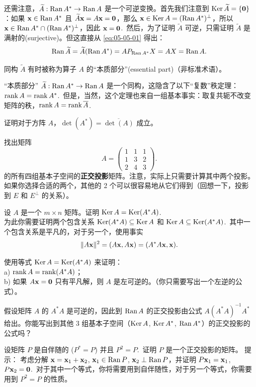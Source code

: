 还需注意，$\widetilde{A}: \operatorname{Ran} A^* \to \operatorname{Ran} A$ 是一个可逆变换。首先我们注意到 $\operatorname{Ker} \widetilde{A} = \{\mathbf{0}\}$：如果 $\mathbf{x} \in \operatorname{Ran} A^*$ 且 $\widetilde{A}\mathbf{x} = A\mathbf{x} = \mathbf{0}$，那么 $\mathbf{x} \in \operatorname{Ker} A = (\operatorname{Ran} A^*)^\perp$，所以 $\mathbf{x} \in \operatorname{Ran} A^* \cap (\operatorname{Ran} A^*)^\perp$，因此 $\mathbf{x} = \mathbf{0}$.~然后，为了证明 $\widetilde{A}$ 可逆，只需证明 $\widetilde{A}$ 是满射的(surjective)。但这直接从 \eqref{eq:05-05-01} 得出：$$\operatorname{Ran} \widetilde{A} = \widetilde{A}(\operatorname{Ran} A^*) = A P_{\operatorname{Ran} A^*} X = AX = \operatorname{Ran} A.$$

同构 $\widetilde{A}$ 有时被称为算子 $A$ 的“本质部分”(essential part)（非标准术语）。

“本质部分” $\widetilde{A}: \operatorname{Ran} A^* \to \operatorname{Ran} A$ 是一个同构，这隐含了以下“复数”秩定理：$\operatorname{rank} A = \operatorname{rank} A^*$.~但是，当然，这个定理也来自一组基本事实：取复共轭不改变矩阵的秩，$\operatorname{rank} A = \operatorname{rank} \overline{A}$.~

\begin{problemset}
\item \label{ex:05-05-01} 证明对于方阵 $A$，$\det(A^*) = \overline{\det(A)}$ 成立。
\item \label{ex:05-05-02} 找出矩阵
$$A = \begin{pmatrix} 1 & 1 & 1 \\ 1 & 3 & 2 \\ 2 & 4 & 3 \end{pmatrix}.$$
的所有四组基本子空间的\textbf{正交投影}矩阵。注意，实际上只需要计算其中两个投影。如果你选择合适的两个，其他的 2 个可以很容易地从它们得到（回想一下，投影到 $E$ 和 $E^\perp$ 的关系）。
\item \label{ex:05-05-03} 设 $A$ 是一个 $m \times n$ 矩阵。证明 $\operatorname{Ker} A = \operatorname{Ker}(A^*A)$.~
\\
为此你需要证明两个包含关系 $\operatorname{Ker}(A^*A) \subseteq \operatorname{Ker} A$ 和 $\operatorname{Ker} A \subseteq \operatorname{Ker}(A^*A)$.~其中一个包含关系是平凡的，对于另一个，使用事实
$$\|A\mathbf{x}\|^2 = (A\mathbf{x}, A\mathbf{x}) = (A^*A\mathbf{x}, \mathbf{x}).$$
\item \label{ex:05-05-04} 使用等式 $\operatorname{Ker} A = \operatorname{Ker}(A^*A)$ 来证明：
\\
a) $\operatorname{rank} A = \operatorname{rank}(A^*A)$；
\\
b) 如果 $A\mathbf{x} = \mathbf{0}$ 只有平凡解，则 $A$ 是左可逆的。（你只需要写出一个左逆的公式）。
\item \label{ex:05-05-05} 假设矩阵 $A$ 的 $A^*A$ 是可逆的，因此到 $\operatorname{Ran} A$ 的正交投影由公式 $A(A^*A)^{-1}A^*$ 给出。你能写出到其他 3 组基本子空间（$\operatorname{Ker} A$, $\operatorname{Ker} A^*$, $\operatorname{Ran} A^*$）的正交投影的公式吗？
\item \label{ex:05-05-06} 设矩阵 $P$ 是自伴随的 ($P^* = P$) 并且 $P^2 = P$.~证明 $P$ 是一个正交投影的矩阵。
{\heiti 提示：} 考虑分解 $\mathbf{x} = \mathbf{x}_1 + \mathbf{x}_2$, $\mathbf{x}_1 \in \operatorname{Ran} P$, $\mathbf{x}_2 \perp \operatorname{Ran} P$，并证明 $P\mathbf{x}_1 = \mathbf{x}_1$, $P\mathbf{x}_2 = \mathbf{0}$.~对于其中一个等式，你将需要用到自伴随性，对于另一个等式，你需要用到 $P^2 = P$ 的性质。
\end{problemset}


